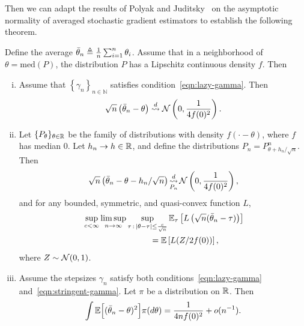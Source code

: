Then we can adapt the results of Polyak and Juditsky~\cite{PolyakJu92}
on the asymptotic normality of averaged stochastic gradient estimators
to establish the following theorem.
\begin{thm}
  \label{thm:sgd}
  Define the average $\bar{\theta}_n \triangleq \frac{1}{n}
  \sum_{i = 1}^n \theta_i$. Assume
  that in a neighborhood
  of $\theta = \mbox{med}(P)$,
  the distribution $P$ has a Lipschitz continuous density $f$.
  Then
  \begin{enumerate}[(i)]
  \item \label{item:normal-sgd}
    Assume that $\left\{ \gamma_n \right\}_{n\in \mathbb N}$ satisfies
    condition~\eqref{eqn:lazy-gamma}.
    Then
    \begin{equation*}
      \sqrt{n}\left( \bar{\theta}_n - \theta\right)
      \stackrel{d}{\rightsquigarrow} \mathcal{N}\left(0,\frac{1}{4 f(0)^2}\right).
    \end{equation*}
  \item \label{item:sgd-regular}
    Let $\{P_\theta\}_{\theta \in \mathbb{R}}$ be the family of distributions
    with density $f(\cdot - \theta)$, where $f$ has median 0.
    Let $h_n \to h \in \mathbb{R}$, and define the distributions
    $P_n = P_{\theta + h_n/\sqrt{n}}^n$. Then
    \begin{equation*}
      \sqrt{n}\left(\bar{\theta}_n - \theta - h_n / \sqrt{n}\right)
      \mathop{\stackrel{d}{\rightsquigarrow}}_{P_n}
      \mathcal{N}\left(0, \frac{1}{4 f(0)^2}\right),
    \end{equation*}
    and for any bounded, symmetric, and quasi-convex function $L$,
    \begin{align} 
      & \sup_{c < \infty} \limsup_{n \to \infty}
      \sup_{\tau\,:\,|\theta-\tau| \leq \frac{c}{\sqrt{n} }}
      \mathbb{E}_\tau \left[ L\left( \sqrt{n}(\bar{\theta}_{n} - \tau) \right) \right] \nonumber 
      \\
      & \qquad \qquad \qquad \qquad = \mathbb E \left[L(Z/ 2 f(0)) \right],
        \label{eq:attaining_LAM}
    \end{align}
    where $Z \sim \mathcal{N}(0,1)$. 
  \item \label{item:sgd-ms-convergence} Assume the stepsizes $\gamma_n$
    satisfy both conditions~\eqref{eqn:lazy-gamma}
    and~\eqref{eqn:stringent-gamma}. Let
    $\pi$ be a distribution on $\mathbb{R}$. Then
    \begin{equation*}
      \int \mathbb{E}\Big[( \bar{\theta}_n - \theta )^2\Big] \pi(d\theta)
      = \frac{1}{4 n f(0)^2} + o(n^{-1}). 
    \end{equation*}
  \end{enumerate}
\end{thm}

